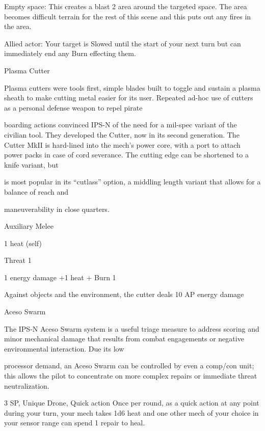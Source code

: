          	Empty space: This creates a blast 2 area around the targeted space. The area becomes  
         difficult terrain for the rest of this scene and this puts out any fires in the area.
 
         Allied actor: 	  Your target is Slowed until the start of your next turn but can immediately  
         end any Burn effecting them.
 

Plasma Cutter
 

Plasma cutters were tools first, simple blades built to toggle and sustain a plasma sheath to make cutting  
metal easier for its user. Repeated ad-hoc use of cutters as a personal defense weapon to repel pirate  

boarding actions convinced IPS-N of the need for a mil-spec variant of the civilian tool. They developed the  
Cutter, now in its second generation. The Cutter MkII is hard-lined into the mech’s power core, with a port  
to attach power packs in case of cord severance. The cutting edge can be shortened to a knife variant, but  

is most popular in its “cutlass” option, a middling length variant that allows for a balance of reach and  

maneuverability in close quarters.    
 

Auxiliary Melee
 
1 heat (self)
 
Threat 1
 
1 energy damage +1 heat + Burn 1
 
Against objects and the environment, the cutter deals 10 AP energy damage
 

                                                                                                                     


Aceso Swarm  

The IPS-N Aceso Swarm system is a useful triage measure to address scoring and minor mechanical  
damage that results from combat engagements or negative environmental interaction. Due its low  

processor demand, an Aceso Swarm can be controlled by even a comp/con unit; this allows the pilot to  
concentrate on more complex repairs or immediate threat neutralization.    

3 SP, Unique  
Drone, Quick action  
Once per round, as a quick action at any point during your turn, your mech takes 1d6 heat and  
one other mech of your choice in your sensor range can spend 1 repair to heal.   
